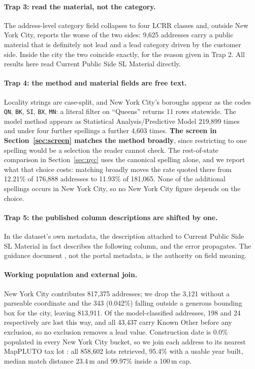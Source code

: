 \documentclass[11pt]{article}
\newcommand{\KO}{\textsf{Known Other}}
\begin{document}
\paragraph{Trap 3: read the material, not the category.}
The address-level category field collapses to four LCRR classes and, outside New York City,
reports the worse of the two sides: 9,625 addresses carry a public material that is
definitely not lead and a lead category driven by the customer side. Inside the city the two
coincide exactly, for the reason given in Trap 2. All results here read
\textsf{Current Public Side SL Material} directly.

\paragraph{Trap 4: the method and material fields are free text.}
Locality strings are case-split, and New York City's boroughs appear as the codes
\texttt{QN}, \texttt{BK}, \texttt{SI}, \texttt{BX}, \texttt{MN}: a literal filter on
``Queens'' returns 11 rows statewide. The model method appears as
\textsf{Statistical Analysis/Predictive Model} 219,899 times and under four further spellings
a further 4,603 times. \textbf{The screen in Section~\ref{sec:screen} matches the method
broadly}, since restricting to one spelling would be a selection the reader cannot check. The
rest-of-state comparison in Section~\ref{sec:nyc} uses the canonical spelling alone, and we
report what that choice costs: matching broadly moves the rate quoted there from 12.21\% of
176,888 addresses to 11.93\% of 181,065. None of the additional spellings occurs in New York
City, so no New York City figure depends on the choice.

\paragraph{Trap 5: the published column descriptions are shifted by one.}
In the dataset's own metadata, the description attached to
\textsf{Current Public Side SL Material} in fact describes the following column, and the
error propagates. The guidance document \cite{nysdohguidance2025}, not the portal metadata,
is the authority on field meaning.

\paragraph{Working population and external join.}
New York City contributes 817,375 addresses; we drop the 3,121 without a parseable coordinate
and the 343 (0.042\%) falling outside a generous bounding box for the city, leaving 813,911.
Of the model-classified addresses, 198 and 24 respectively are lost this way, and all 43,437
carry \KO{} before any exclusion, so no exclusion removes a lead value.
Construction date is 0.0\% populated in every New York City bucket, so we join each address to
its nearest MapPLUTO tax lot \cite{mappluto}: all 858,602 lots retrieved, 95.4\% with a usable
year built, median match distance 23.4\,m and 99.97\% inside a 100\,m cap.
\end{document}
